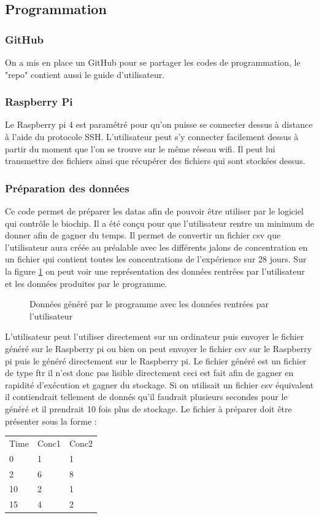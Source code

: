 \documentclass[a4paper, 11pt]{article}
\begin{document}
\subsection{Programmation}
\subsubsection{GitHub}
On a mis en place un GitHub pour se partager les codes de programmation, le "repo" contient aussi le guide d'utilisateur.
\subsubsection{Raspberry Pi}
Le Raspberry pi 4 est paramétré pour qu'on puisse se connecter dessus à distance à l'aide du protocole SSH.
L'utilisateur peut s'y connecter facilement dessus à partir du moment que l'on se trouve sur le même réseau wifi.
Il peut lui transmettre des fichiers ainsi que récupérer des fichiers qui sont stockées dessus.
\subsubsection{Préparation des données}
Ce code permet de préparer les datas afin de pouvoir être utiliser par le logiciel qui contrôle le biochip.
Il a été conçu pour que l'utilisateur rentre un minimum de donner afin de gagner du temps.
Il permet de convertir un fichier csv que l'utilisateur aura créée au préalable avec les différents jalons de concentration en un fichier qui contient toutes les concentrations de l'expérience sur 28 jours.
Sur la figure \ref{fig:dataPreparation} on peut voir une représentation des données rentrées par l'utilisateur et les données produites par le programme.
\begin{figure}[H]
    \centering
    \caption{Données généré par le programme avec les données rentrées par l'utilisateur}
    \label{fig:dataPreparation}
\end{figure}
L'utilisateur peut l'utiliser directement sur un ordinateur puis envoyer le fichier généré sur le Raspberry pi ou bien on peut envoyer le fichier csv sur le Raspberry pi puis le généré directement sur le Raspberry pi.
Le fichier généré est un fichier de type ftr il n'est donc pas lisible directement ceci est fait afin de gagner en rapidité d'exécution et gagner du stockage.
Si on utilisait un fichier csv équivalent il contiendrait tellement de donnés qu'il faudrait plusieurs secondes pour le généré et il prendrait 10 fois plus de stockage.
Le fichier à préparer doit être présenter sous la forme :
\begin{table}[H]
    \centering
    \begin{tabular}{lll}
        Time & Conc1 & Conc2 \\
        0    & 1     & 1     \\
        2    & 6     & 8     \\
        10   & 2     & 1     \\
        15   & 4     & 2
    \end{tabular}
\end{table}
\end{document}
